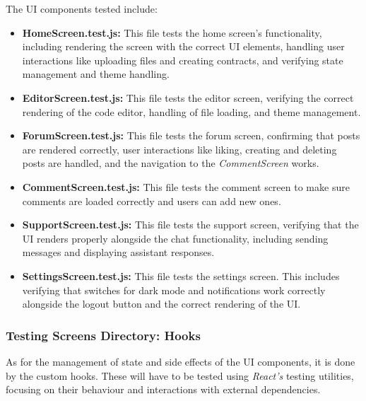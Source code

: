 The UI components tested include:

\begin{itemize}
    \item \textbf{HomeScreen.test.js:} This file tests the home screen's functionality, including rendering the screen with the correct UI elements, handling user interactions like uploading files and creating contracts, and verifying state management and theme handling.
    \item \textbf{EditorScreen.test.js:} This file tests the editor screen, verifying the correct rendering of the code editor, handling of file loading, and theme management.
    \item \textbf{ForumScreen.test.js:} This file tests the forum screen, confirming that posts are rendered correctly, user interactions like liking, creating and deleting posts are handled, and the navigation to the \textit{CommentScreen} works.
    \item \textbf{CommentScreen.test.js:} This file tests the comment screen to make sure comments are loaded correctly and users can add new ones.
    \item \textbf{SupportScreen.test.js:} This file tests the support screen, verifying that the UI renders properly alongside the chat functionality, including sending messages and displaying assistant responses.
    \item \textbf{SettingsScreen.test.js:} This file tests the settings screen. This includes verifying that switches for dark mode and notifications work correctly alongside the logout button and the correct rendering of the UI.
\end{itemize}

\subsubsection{Testing Screens Directory: Hooks}

As for the management of state and side effects of the UI components, it is done by the custom hooks. These will have to be tested using \textit{React's} testing utilities, focusing on their behaviour and interactions with external dependencies.

